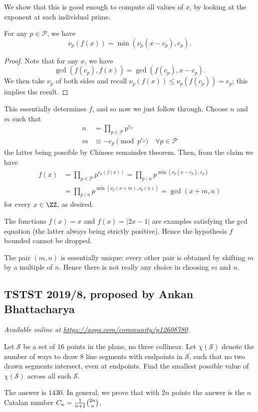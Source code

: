 \documentclass[11pt]{scrartcl}
\begin{document}
We show that this is good enough to compute all values of $x$,
by looking at the exponent at each individual prime.
\begin{claim*}
  For any $p \in \mathcal P$, we have
  \[ \nu_p(f(x)) = \min(\nu_p(x - c_p), e_p). \]
\end{claim*}
\begin{proof}
  Note that for any $x$, we have
  \[ \gcd(f(c_p), f(x)) = \gcd(f(c_p), x - c_p). \]
  We then take $\nu_p$ of both sides
  and recall $\nu_p(f(x)) \le \nu_p(f(c_p)) = e_p$;
  this implies the result.
\end{proof}

This essentially determines $f$, and so now we just follow through.
Choose $n$ and $m$ such that
\begin{align*}
  n &= \prod_{p \in \mathcal P} p^{e_p} \\
  m &\equiv -c_p \pmod{p^{e_p}} \quad \forall p \in \mathcal P
\end{align*}
the latter being possible by Chinese remainder theorem.
Then, from the claim we have
\begin{align*}
  f(x) &= \prod_{p \in \mathcal P} p^{\nu_p(f(x))}
  = \prod_{p \mid n} p^{\min(\nu_p(x-c_p), e_p)} \\
  &= \prod_{p \mid n} p^{\min(\nu_p(x+m), \nu_p(n))}
  = \gcd\left( x+m, n \right)
\end{align*}
for every $x \in \ZZ$, as desired.

\begin{remark*}
  The functions $f(x) = x$ and
  $f(x) = |2x - 1|$ are examples satisfying the gcd equation
  (the latter always being strictly positive).
  Hence the hypothesis $f$ bounded cannot be dropped.
\end{remark*}

\begin{remark*}
  The pair $(m, n)$ is essentially unique:
  every other pair is obtained by
  shifting $m$ by a multiple of $n$.
  Hence there is not really any choice in choosing $m$ and $n$.
\end{remark*}
\pagebreak

\subsection{TSTST 2019/8, proposed by Ankan Bhattacharya}
\textsl{Available online at \url{https://aops.com/community/p12608780}.}
\begin{mdframed}[style=mdpurplebox,frametitle={Problem statement}]
Let $\mathcal{S}$ be a set of $16$ points in the plane, no three collinear.
Let $\chi(\mathcal{S})$ denote the number of ways to
draw $8$ line segments with endpoints in $\mathcal{S}$,
such that no two drawn segments intersect, even at endpoints.
Find the smallest possible value of $\chi(\mathcal{S})$
across all such $\mathcal{S}$.
\end{mdframed}
The answer is $1430$.
In general, we prove that with $2n$ points
the answer is the $n$ Catalan number
$C_n = \tfrac{1}{n+1}\tbinom{2n}{n}$.
\end{document}
